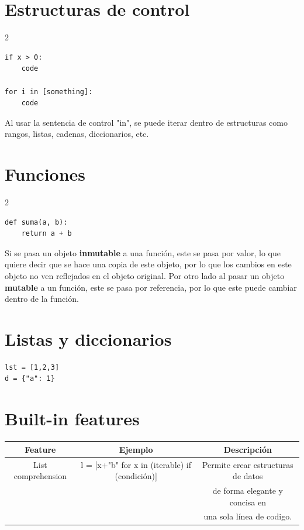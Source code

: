 \documentclass[a4paper,10pt]{article}
\begin{document}
\section*{Estructuras de control}
\begin{multicols}{2}
\begin{lstlisting}
if x > 0:
    code

for i in [something]:
    code

\end{lstlisting}
\columnbreak

Al usar la sentencia de control "in", se puede iterar dentro de estructuras como rangos, listas, cadenas, diccionarios, etc.
\end{multicols}

\section*{Funciones}
\begin{multicols}{2}
\begin{lstlisting}
def suma(a, b):
    return a + b
\end{lstlisting}
\columnbreak
    Si se pasa un objeto \textbf{inmutable} a una función, este se pasa por valor, lo que quiere decir que
se hace una copia de este objeto, por lo que los cambios en este objeto no ven reflejados en el objeto original.
Por otro lado al pasar un objeto \textbf{mutable} a un función, este se pasa por referencia, por lo que
este puede cambiar dentro de la función.
\end{multicols}



\section*{Listas y diccionarios}
\begin{lstlisting}
lst = [1,2,3]
d = {"a": 1}
\end{lstlisting}

\section*{Built-in features}
\begin{center}
    \begin{tabular}{| c | c | c |}
        \hline
        Feature & Ejemplo & Descripción \\
        \hline\hline
        List comprehension & l = [x+"b" for x in (iterable) if (condición)] & Permite crear estructuras de datos \\ && de forma elegante y concisa en \\ && una sola línea de codigo.\\
        \hline
    \end{tabular}
\end{center}
\end{document}
